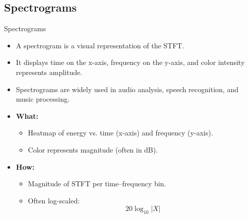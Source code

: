 \subsection{Spectrograms}
\begin{frame}[allowframebreaks]{Spectrograms}
    \begin{itemize}
        \item A spectrogram is a visual representation of the STFT.
        \item It displays time on the x-axis, frequency on the y-axis, and color intensity represents amplitude.
        \item Spectrograms are widely used in audio analysis, speech recognition, and music processing.
    \end{itemize}
\framebreak
    \begin{itemize}
        \item \textbf{What:}
        \begin{itemize}
            \item Heatmap of energy vs. time (x-axis) and frequency (y-axis).
            \item Color represents magnitude (often in dB).
        \end{itemize}

        \item \textbf{How:}
        \begin{itemize}
            \item Magnitude of STFT per time–frequency bin.
            \item Often log-scaled:
            \[
                20 \log_{10} |X|
            \]
        \end{itemize}


\end{itemize}
\end{frame}
